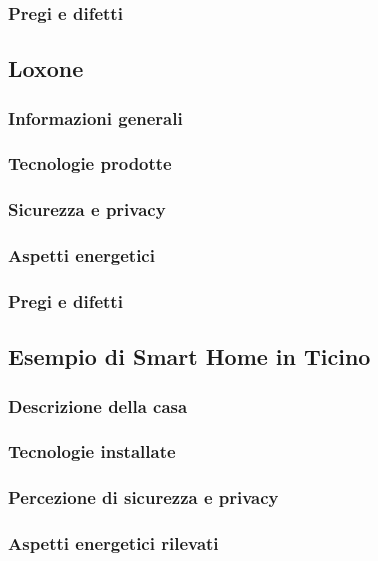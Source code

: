 \documentclass{article}
\begin{document}
\subsubsection{Pregi e difetti}

\subsection{Loxone}

\subsubsection{Informazioni generali}

\subsubsection{Tecnologie prodotte}

\subsubsection{Sicurezza e privacy}

\subsubsection{Aspetti energetici}

\subsubsection{Pregi e difetti}

\subsection{Esempio di Smart Home in Ticino}

\subsubsection{Descrizione della casa}

\subsubsection{Tecnologie installate}

\subsubsection{Percezione di sicurezza e privacy}

\subsubsection{Aspetti energetici rilevati}

\end{document}

